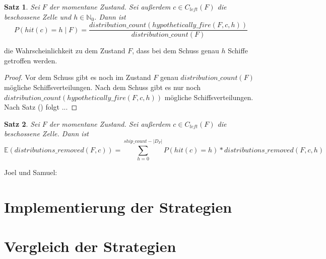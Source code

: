 \documentclass[a4paper,12pt]{llncs}
\newcommand{\N}{{\mathbb{N}}}
\numberwithin{equation}{section}
\newtheorem{satz}{Satz}
\begin{document}
\begin{satz}
Sei $F$ der momentane Zustand.
Sei außerdem $c \in C_{left}(F)$ die beschossene Zelle und $h \in \N_0$.
Dann ist
\[
P(hit(c)=h \mid F)=\frac{distribution\_count(hypothetically\_fire(F,c, h))}{distribution\_count(F)}
\]
\end{satz}
die Wahrscheinlichkeit zu dem Zustand $F$, dass bei dem Schuss genau $h$ Schiffe getroffen werden.

\begin{proof}
Vor dem Schuss gibt es noch im Zustand $F$ genau $distribution\_count(F)$ mögliche Schiffsverteilungen.
Nach dem Schuss gibt es nur noch $distribution\_count(hypothetically\_fire(F,c, h))$ mögliche Schiffsverteilungen.
Nach Satz () folgt ...
\end{proof}

\begin{satz}
Sei $F$ der momentane Zustand.
Sei außerdem $c \in C_{left}(F)$ die beschossene Zelle.
Dann ist
\[
\mathds{E}(distributions\_removed(F,c))=\sum_{h=0}^{ship\_count - |D_F|} P(hit(c)=h) * distributions\_removed(F,c,h)
\]
\end{satz}

Joel und Samuel:

\section{Implementierung der Strategien}

\section{Vergleich der Strategien}


\newpage

 

\end{document}
